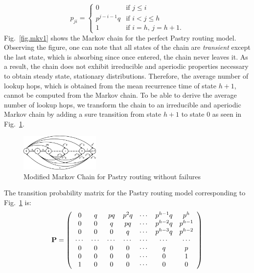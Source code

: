 \documentclass[10pt,twocolumn]{article}
\begin{document}
\[ p_{ji} = \left\{ \begin{array}{ll}
         0 & \mbox{if $j \le i$}\\
         p^{j-i-1}q & \mbox{if $i < j \le h$} \\
         1   &  \mbox{if $i = h$, $j=h+1$}
         .\end{array} \right. \]
Fig.~\ref{fig.mkv1} shows the Markov chain for the perfect Pastry routing
model. Observing the figure, one can note that all states of the chain are {\em
transient} except the last state, which is absorbing since once entered, the chain
never leaves it. As a result, the
chain does not exhibit irreducible  and aperiodic properties necessary to
obtain steady state, stationary distributions. Therefore, the average number of
lookup hops, which is obtained from the mean recurrence time of state $h+1$,
cannot be computed from the Markov chain. To be able to derive the average
number of lookup hops, we transform the chain to an irreducible and aperiodic
Markov chain by  adding a sure transition from state $h+1$ to state $0$ as seen
in Fig.~\ref{fig.ergo}.

\begin{figure}[tb] \centering
     {\includegraphics[width=0.35\textwidth]{Markov-Modify.eps}
     \caption{Modified Markov Chain for Pastry routing without failures}
     \label{fig.ergo}}
\end{figure}

The transition probability matrix for the Pastry routing model
corresponding to Fig.~\ref{fig.ergo} is:
\[ {\bf P} = \left( \begin{array}{ccccccc}
0 & q & pq & p^2q & \cdots  &p^{h-1}q & p^h  \\
0 & 0 & q & pq & \cdots &p^{h-2}q & p^{h-1}\\
0 & 0 & 0 &q & \cdots & p^{h-3}q & p^{h-2} \\
\cdots & \cdots & \cdots &\cdots & \cdots & \cdots & \cdots \\
0 & 0 & 0 &0 & \cdots & q & p \\
0 & 0 & 0 &0 & \cdots & 0 & 1 \\
1 & 0 & 0 &0 & \cdots & 0 & 0  \end{array} \right)\]

\end{document}

